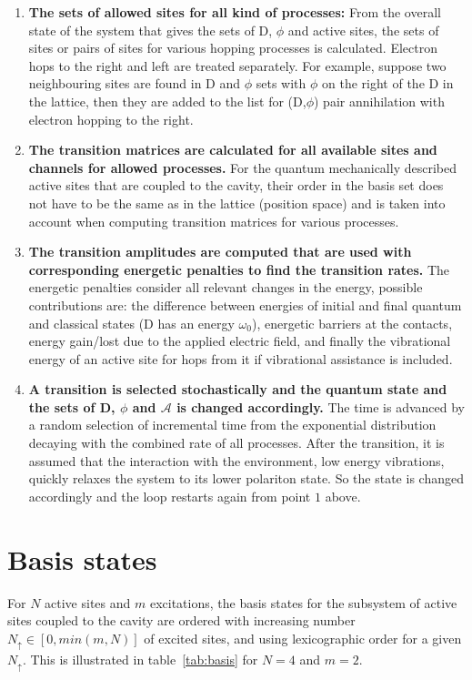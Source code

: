 \documentclass[a4paper,twocolumn]{revtex4-1} %
\newcommand{\ua}{\uparrow}
\begin{document}
\begin{enumerate}
\item 
{\bf The sets of allowed sites for all kind of processes:}
From the overall state of the system
that gives
the sets of D, $\phi$ and active sites, 
the sets of sites or pairs of sites for various hopping processes
is calculated. Electron hops to the right and left are treated separately.
For example, suppose two neighbouring sites are found in D and $\phi$ sets
with $\phi$ on the right of the D in the lattice, 
then they are added to the list for (D,$\phi$) pair annihilation with electron hopping to the right.


\item
{\bf The transition matrices are calculated for all available sites and channels for allowed processes.}
For the quantum mechanically described active sites that are coupled to the cavity,
their order in the basis set does not have to be the same as in the lattice (position space)
and is taken into account when computing transition matrices for various processes.

\item
{\bf  The transition amplitudes are computed that are used with corresponding energetic penalties 
to find the transition rates.}
The energetic penalties consider all relevant changes in the energy, possible contributions are:
the difference between energies of initial and final quantum
and classical states (D has an energy $\omega_0$),
energetic barriers at the contacts, energy gain/lost due to the applied electric field,
and finally the vibrational energy of an active site for hops from it if vibrational assistance is included.

\item 
{\bf  A transition is selected stochastically and the quantum state and the sets of D, $\phi$ and $\mathcal{A}$ is changed accordingly.}
The time is advanced by a random selection of incremental time
from the exponential distribution decaying with the combined rate of all processes. 
After the transition, it is assumed that the interaction with the environment, low energy vibrations,
quickly relaxes the system to its lower polariton state.
So the state is changed accordingly and the loop restarts again from point $1$ above.

\end{enumerate}


\section{Basis states}
For $N$ active sites and $m$ excitations,
the basis states for the subsystem of active sites coupled to the cavity
are ordered with increasing number $N_{\ua}\in [0,min(m,N)]$ of excited sites,
and using lexicographic order for a given $N_{\ua}$. This is illustrated in table~\ref{tab:basis}
for $N=4$ and $m=2$.
\end{document}
